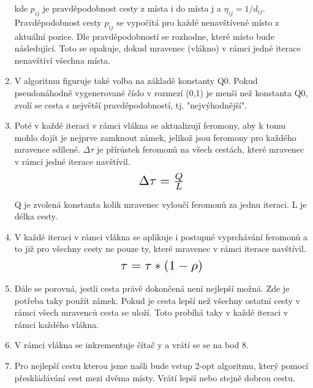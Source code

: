 \begin{enumerate}
\begin{center}
\begin{equation*}
\end{equation*}
\end{center}
kde $p_{i j}$ je pravděpodobnost cesty z místa i do místa j a $\eta_{i j} = 1/d_{i j}$. Pravděpodobnost cesty $p_{i j}$ se vypočítá pro každé nenavštívené místo z aktuální pozice. Dle pravděpodobností se rozhodne, které místo bude následující. Toto se opakuje, dokud mravenec (vlákno) v rámci jedné iterace nenavštíví všechna místa.
\item V algoritmu figuruje také volba na základě konstanty Q0. Pokud pseudonáhodně vygenerované číslo v rozmezí (0,1) je menší než konstanta Q0, zvolí se cesta s největší pravděpodobností, tj. "nejvýhodnější".


\item Poté v každé iteraci v rámci vlákna se aktualizují feromony, aby k tomu mohlo dojít je nejprve zamknout zámek, jelikož jsou feromony pro každého mravence sdílené. $\Delta \tau$ je přírůstek feromonů na všech cestách, které mravenec v rámci jedné iterace navštívil. 
\begin{equation*}
    \scalebox{1.5}{$\Delta \tau = \frac{Q}{L} $}
\end{equation*}

Q je zvolená konstanta kolik mravenec vyloučí feromonů za jednu iteraci. L je délka cesty. 
\item V každé iteraci v rámci vlákna se aplikuje i postupné vyprchávání feromonů a to již pro všechny cesty ne pouze ty, které mravenec v rámci iterace navštívil. 
\begin{equation*}
    \scalebox{1.5}{$\tau = \tau*(1-\rho) $}
\end{equation*}

\item Dále se porovná, jestli cesta právě dokončená není nejlepší možná. Zde je potřeba taky použít zámek. Pokud je cesta lepší než všechny ostatní cesty v rámci všech mravenců cesta se uloží. Toto probíhá taky v každé iteraci v rámci každého vlákna. 
\item V rámci vlákna se inkrementuje čítač y a vrátí se se na bod 8. 
\item Pro nejlepší cestu kterou jsme našli bude vstup 2-opt algoritmu, který pomocí přeskládávání cest mezi dvěma místy. Vrátí lepší nebo stejně dobrou cestu. 

\end{enumerate}
